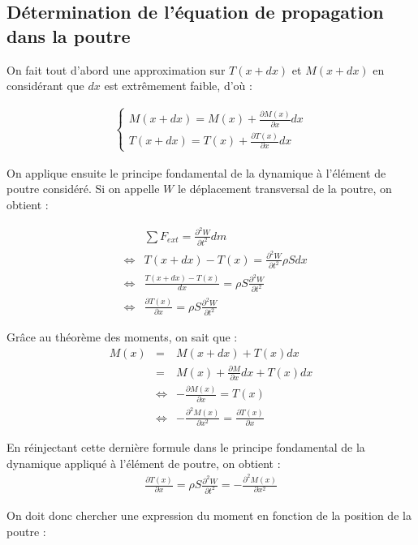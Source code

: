\documentclass[a4paper,11pt]{report} %
\begin{document}
\subsection{Détermination de l'équation de propagation dans la poutre}
On fait tout d'abord une approximation sur $T(x+dx)$ et $M(x+dx)$ en considérant que $dx$ est extrêmement faible, d'où : 

\begin{eqnarray*}
\begin{cases} M(x+dx) = M(x) + \frac{\partial M(x)}{\partial x} dx  \\ T(x+dx) = T(x) + \frac{\partial T(x)}{\partial x} dx  \end{cases}
\end{eqnarray*}

On applique ensuite le principe fondamental de la dynamique à l'élément de poutre considéré. Si on appelle $W$ le déplacement transversal de la poutre, on obtient :

\begin{eqnarray*}
&& \sum F_{ext} = \frac{\partial ^2 W}{\partial t^2} dm \\
&  \Leftrightarrow & T(x+dx) - T(x) = \frac{\partial ^2 W}{\partial t^2} \rho S dx\\
&  \Leftrightarrow & \frac{T(x+dx) - T(x)}{dx} = \rho S \frac{\partial ^2 W}{\partial t^2} \\
& \Leftrightarrow & \frac{\partial T(x)}{\partial x} = \rho S \frac{\partial ^2 W}{\partial t^2}
\end{eqnarray*}

Grâce au théorème des moments, on sait que :
\begin{eqnarray*}
M(x) & = & M(x+dx) + T(x) dx \\
 & = & M(x) + \frac{\partial M}{\partial x} dx + T(x) dx \\
 &  \Leftrightarrow & -\frac{\partial M(x)}{\partial x} = T(x) \\
 &  \Leftrightarrow & - \frac{\partial ^2 M(x)}{\partial x^2} = \frac{\partial T(x)}{\partial x}
\end{eqnarray*}

En réinjectant cette dernière formule dans le principe fondamental de la dynamique appliqué à l'élément de poutre, on obtient : 
\begin{eqnarray*}
\frac{\partial T(x)}{\partial x} = \rho S \frac{\partial ^2 W}{\partial t^2} = -\frac{\partial ^2 M(x)}{\partial x^2}
\end{eqnarray*}

On doit donc chercher une expression du moment en fonction de la position de la poutre :
\end{document}
